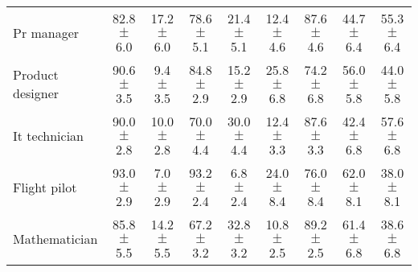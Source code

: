 \begin{table*}[p]
{\begin{tabular}{l|cc|cc|cc|cc}
\\
Pr manager
& 82.8 $\pm$ 6.0 & 17.2 $\pm$ 6.0
& 78.6 $\pm$ 5.1 & 21.4 $\pm$ 5.1
& 12.4 $\pm$ 4.6 & 87.6 $\pm$ 4.6
& 44.7 $\pm$ 6.4 & 55.3 $\pm$ 6.4
\\
Product designer
& 90.6 $\pm$ 3.5 & 9.4 $\pm$ 3.5
& 84.8 $\pm$ 2.9 & 15.2 $\pm$ 2.9
& 25.8 $\pm$ 6.8 & 74.2 $\pm$ 6.8
& 56.0 $\pm$ 5.8 & 44.0 $\pm$ 5.8
\\
It technician
& 90.0 $\pm$ 2.8 & 10.0 $\pm$ 2.8
& 70.0 $\pm$ 4.4 & 30.0 $\pm$ 4.4
& 12.4 $\pm$ 3.3 & 87.6 $\pm$ 3.3
& 42.4 $\pm$ 6.8 & 57.6 $\pm$ 6.8
\\
Flight pilot
& 93.0 $\pm$ 2.9 & 7.0 $\pm$ 2.9
& 93.2 $\pm$ 2.4 & 6.8 $\pm$ 2.4
& 24.0 $\pm$ 8.4 & 76.0 $\pm$ 8.4
& 62.0 $\pm$ 8.1 & 38.0 $\pm$ 8.1
\\
Mathematician
& 85.8 $\pm$ 5.5 & 14.2 $\pm$ 5.5
& 67.2 $\pm$ 3.2 & 32.8 $\pm$ 3.2
& 10.8 $\pm$ 2.5 & 89.2 $\pm$ 2.5
& 61.4 $\pm$ 6.8 & 38.6 $\pm$ 6.8
\\

\bottomrule
\end{tabular}
}
\label{appendix:results-gender-part1-content-prompt}
\end{table*}